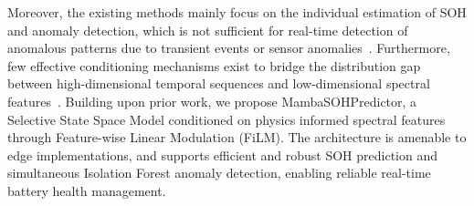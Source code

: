 Moreover, the existing methods mainly focus on the individual estimation of SOH
and anomaly detection, which is not sufficient for real-time detection of
anomalous patterns due to transient events or sensor
anomalies~\cite{arbaoui2024}. Furthermore, few effective conditioning
mechanisms exist to bridge the distribution gap between high-dimensional
temporal sequences and low-dimensional spectral features~\cite{meng2026}.
Building upon prior work, we propose MambaSOHPredictor, a Selective State Space
Model conditioned on physics informed spectral features through Feature-wise
Linear Modulation (FiLM). The architecture is amenable to edge implementations,
and supports efficient and robust SOH prediction and simultaneous Isolation
Forest anomaly detection, enabling reliable real-time battery health management.
